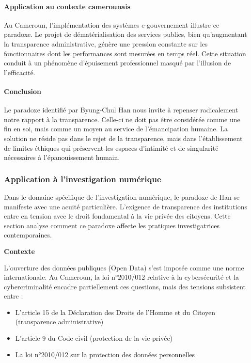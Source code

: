 \documentclass[12pt,a4paper]{article}
\begin{document}
\paragraph{Application au contexte camerounais}
Au Cameroun, l'implémentation des systèmes e-gouvernement illustre ce paradoxe. Le projet de dématérialisation des services publics, bien qu'augmentant la transparence administrative, génère une pression constante sur les fonctionnaires dont les performances sont mesurées en temps réel. Cette situation conduit à un phénomène d'épuisement professionnel masqué par l'illusion de l'efficacité.

\paragraph{Conclusion}

Le paradoxe identifié par Byung-Chul Han nous invite à repenser radicalement notre rapport à la transparence. Celle-ci ne doit pas être considérée comme une fin en soi, mais comme un moyen au service de l'émancipation humaine. La solution ne réside pas dans le rejet de la transparence, mais dans l'établissement de limites éthiques qui préservent les espaces d'intimité et de singularité nécessaires à l'épanouissement humain.

\subsubsection{Application à l'investigation numérique}



Dans le domaine spécifique de l'investigation numérique, le paradoxe de Han se manifeste avec une acuité particulière. L'exigence de transparence des institutions entre en tension avec le droit fondamental à la vie privée des citoyens. Cette section analyse comment ce paradoxe affecte les pratiques investigatrices contemporaines.

\textbf{Contexte}

L'ouverture des données publiques (Open Data) s'est imposée comme une norme internationale. Au Cameroun, la loi n°2010/012 relative à la cybersécurité et la cybercriminalité encadre partiellement ces questions, mais des tensions subsistent entre :
\begin{itemize}
\item L'article 15 de la Déclaration des Droits de l'Homme et du Citoyen (transparence administrative)
\item L'article 9 du Code civil (protection de la vie privée)
\item La loi n°2010/012 sur la protection des données personnelles
\end{itemize}
\end{document}
